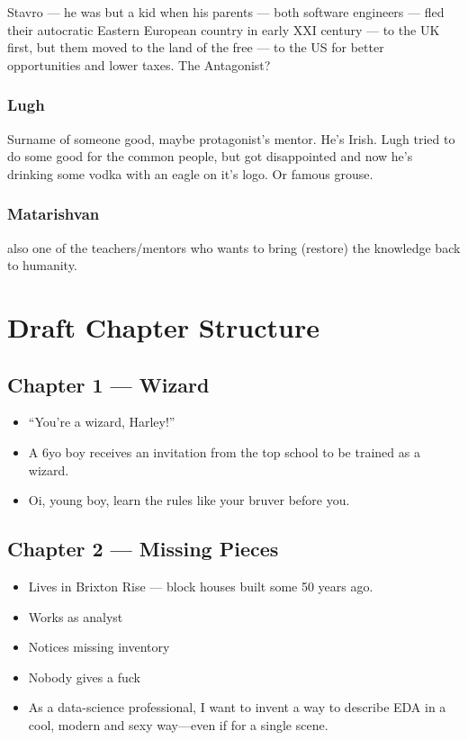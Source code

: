 \documentclass[12pt]{article}
\begin{document}
Stavro — he was but a kid when his parents — both software engineers — fled their autocratic Eastern European country in early XXI century — to the UK first, but them moved to the land of the free — to the US for better opportunities and lower taxes. The Antagonist?

\subsubsection*{Lugh}

Surname of someone good, maybe protagonist’s mentor. He’s Irish. Lugh tried to do some good for the common people, but got disappointed and now he’s drinking some vodka with an eagle on it’s logo. Or famous grouse.

\subsubsection*{Matarishvan}

also one of the teachers/mentors who wants to bring (restore) the knowledge back to humanity.

\section{Draft Chapter Structure}

\subsection{Chapter 1 — Wizard}

\begin{itemize}
  \item “You’re a wizard, Harley!”
  \item A 6yo boy receives an invitation from the top school to be trained as a wizard.
  \item Oi, young boy, learn the rules like your bruver before you.
\end{itemize}

\subsection{Chapter 2 — Missing Pieces}

\begin{itemize}
  \item Lives in Brixton Rise — block houses built some 50 years ago.
  \item Works as analyst
  \item Notices missing inventory
  \item Nobody gives a fuck
  \item As a data-science professional, I want to invent a way to describe EDA in a cool, modern and sexy way—even if for a single scene.
\end{itemize}
\end{document}
